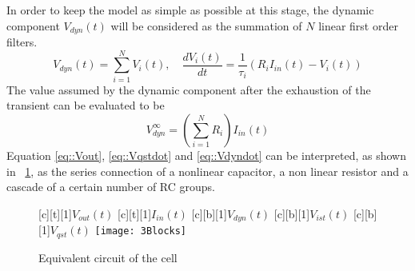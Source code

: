 \documentclass[journal]{IEEEtran}
\begin{document}
In order to keep the model as simple as possible at this stage, the dynamic component $V_{dyn}(t)$ will be considered as the summation of $N$ linear first order filters.
\begin{equation}
V_{dyn}(t)=\sum_{i=1}^{N}V_{i}(t) , \quad \frac{dV_{i}(t)}{dt}=\frac{1}{\tau_{i}}\left(R_{i}I_{in}(t)-V_{i}(t)\right)
\label{eq::Vdyndot}
\end{equation}
The value assumed by the dynamic component after the exhaustion of the transient can be evaluated to be 
\begin{equation}
V_{dyn}^{\infty}=\left(\sum_{i=1}^{N}R_{i}\right) I_{in}(t)
\label{eq::Vdyninf}
\end{equation} 
Equation \eqref{eq::Vout}, \eqref{eq::Vqstdot} and \eqref{eq::Vdyndot} can be interpreted, as shown in \figurename~\ref{fig::3Blocks}, as the series connection of a nonlinear capacitor, a non linear resistor and a cascade of a certain number of RC groups.
\begin{figure}[!htbp]
    [c][t][1]{$V_{out}(t)$}
    [c][t][1]{$I_{in}(t)$}
    [c][b][1]{$V_{dyn}(t)$}
    [c][b][1]{$V_{ist}(t)$}
    [c][b][1]{$V_{qst}(t)$}
	\centering
	\texttt{[image: 3Blocks]}
	\caption{Equivalent circuit of the cell}
	\label{fig::3Blocks}
\end{figure}
\end{document}
